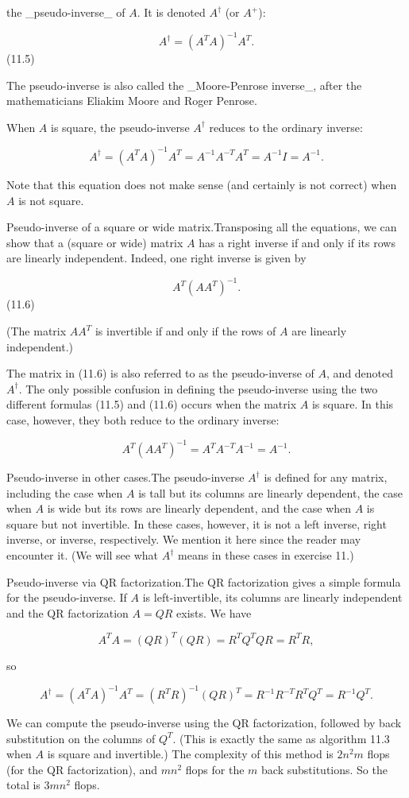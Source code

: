 the _pseudo-inverse_ of \(A\). It is denoted \(A^{\dagger}\) (or \(A^{+}\)):

\[A^{\dagger}=(A^{T}A)^{-1}A^{T}.\] (11.5)

The pseudo-inverse is also called the _Moore-Penrose inverse_, after the mathematicians Eliakim Moore and Roger Penrose.

When \(A\) is square, the pseudo-inverse \(A^{\dagger}\) reduces to the ordinary inverse:

\[A^{\dagger}=(A^{T}A)^{-1}A^{T}=A^{-1}A^{-T}A^{T}=A^{-1}I=A^{-1}.\]

Note that this equation does not make sense (and certainly is not correct) when \(A\) is not square.

Pseudo-inverse of a square or wide matrix.Transposing all the equations, we can show that a (square or wide) matrix \(A\) has a right inverse if and only if its rows are linearly independent. Indeed, one right inverse is given by

\[A^{T}(AA^{T})^{-1}.\] (11.6)

(The matrix \(AA^{T}\) is invertible if and only if the rows of \(A\) are linearly independent.)

The matrix in (11.6) is also referred to as the pseudo-inverse of \(A\), and denoted \(A^{\dagger}\). The only possible confusion in defining the pseudo-inverse using the two different formulas (11.5) and (11.6) occurs when the matrix \(A\) is square. In this case, however, they both reduce to the ordinary inverse:

\[A^{T}(AA^{T})^{-1}=A^{T}A^{-T}A^{-1}=A^{-1}.\]

Pseudo-inverse in other cases.The pseudo-inverse \(A^{\dagger}\) is defined for any matrix, including the case when \(A\) is tall but its columns are linearly dependent, the case when \(A\) is wide but its rows are linearly dependent, and the case when \(A\) is square but not invertible. In these cases, however, it is not a left inverse, right inverse, or inverse, respectively. We mention it here since the reader may encounter it. (We will see what \(A^{\dagger}\) means in these cases in exercise 11.)

Pseudo-inverse via QR factorization.The QR factorization gives a simple formula for the pseudo-inverse. If \(A\) is left-invertible, its columns are linearly independent and the QR factorization \(A=QR\) exists. We have

\[A^{T}A=(QR)^{T}(QR)=R^{T}Q^{T}QR=R^{T}R,\]

so

\[A^{\dagger}=(A^{T}A)^{-1}A^{T}=(R^{T}R)^{-1}(QR)^{T}=R^{-1}R^{-T}R^{T}Q^{T}=R^ {-1}Q^{T}.\]

We can compute the pseudo-inverse using the QR factorization, followed by back substitution on the columns of \(Q^{T}\). (This is exactly the same as algorithm 11.3 when \(A\) is square and invertible.) The complexity of this method is \(2n^{2}m\) flops (for the QR factorization), and \(mn^{2}\) flops for the \(m\) back substitutions. So the total is \(3mn^{2}\) flops.

 